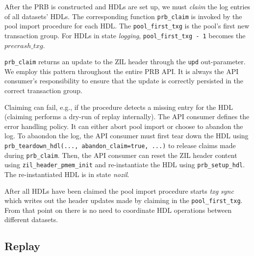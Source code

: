 \documentclass[12pt,a4paper,twoside]{book}
\begin{document}
After the PRB is constructed and HDLs are set up, we must \textit{claim} the log entries of all datasets' HDLs.
The corresponding function \lstinline{prb_claim} is invoked by the pool import procedure for each HDL.
The \lstinline{pool_first_txg} is the pool's first new transaction group.
For HDLs in state \textit{logging}, \lstinline{pool_first_txg - 1} becomes the $precrash\_txg$.

\lstinline{prb_claim} returns an update to the ZIL header through the \lstinline{upd} out-parameter.
We employ this pattern throughout the entire PRB API.
It is always the API consumer's responsibility to ensure that the update is correctly persisted in the correct transaction group.

Claiming can fail, e.g., if the procedure detects a missing entry for the HDL (claiming performs a dry-run of replay internally).
The API consumer defines the error handling policy.
It can either abort pool import or choose to abandon the log.
To abaondon the log, the API consumer must first tear down the HDL using \lstinline{prb_teardown_hdl(..., abandon_claim=true, ...)} to release claims made during \lstinline{prb_claim}.
Then, the API consumer can reset the ZIL header content using \lstinline{zil_header_pmem_init} and re-instantiate the HDL using \lstinline{prb_setup_hdl}.
The re-instantiated HDL is in state \textit{nozil}.

After all HDLs have been claimed the pool import procedure starts \textit{txg sync} which writes out the header updates made by claiming in the \lstinline{pool_first_txg}.
From that point on there is no need to coordinate HDL operations between different datasets.


\subsection{Replay}\label{di:prb:api:replay}
\end{document}
